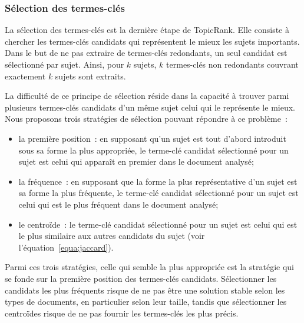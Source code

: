       \subsubsection{Sélection des termes-clés}
      \label{subsubsec:main-automatic_keyphrase_annotation-unsupervised_automatic_keyphrase_extraction-topicrank-keyphrase_selection}
        La sélection des termes-clés est la dernière étape de TopicRank. Elle
        consiste à chercher les termes-clés candidats qui représentent le mieux
        les sujets importants. Dans le but de ne pas extraire de termes-clés
        redondants, un seul candidat est sélectionné par sujet.
        Ainsi, pour $k$ sujets, $k$ termes-clés non redondants couvrant
        exactement $k$ sujets sont extraits.

        La difficulté de ce principe de sélection réside dans la capacité à
        trouver parmi plusieurs termes-clés candidats d'un même sujet celui qui
        le représente le mieux. Nous proposons trois stratégies de sélection
        pouvant répondre à ce problème~:
        \begin{itemize}
          \item{la première position~: en supposant qu'un sujet est tout d'abord
                introduit sous sa forme la plus appropriée, le terme-clé
                candidat sélectionné pour un sujet est celui qui apparaît en
                premier dans le document analysé;}
          \item{la fréquence~: en supposant que la forme la plus représentative
                d'un sujet est sa forme la plus fréquente, le terme-clé candidat
                sélectionné pour un sujet est celui qui est le plus fréquent
                dans le document analysé;}
          \item{le centroïde~: le terme-clé candidat sélectionné pour un sujet
                est celui qui est le plus similaire aux autres candidats du
                sujet (voir l'équation~\ref{equa:jaccard}).}
        \end{itemize}
        Parmi ces trois stratégies, celle qui semble la plus appropriée est la
        stratégie qui se fonde sur la première position des termes-clés
        candidats. Sélectionner les candidats les plus fréquents risque de ne
        pas être une solution stable selon les types de documents, en
        particulier selon leur taille, tandis que sélectionner les centroïdes
        risque de ne pas fournir les termes-clés les plus précis.

